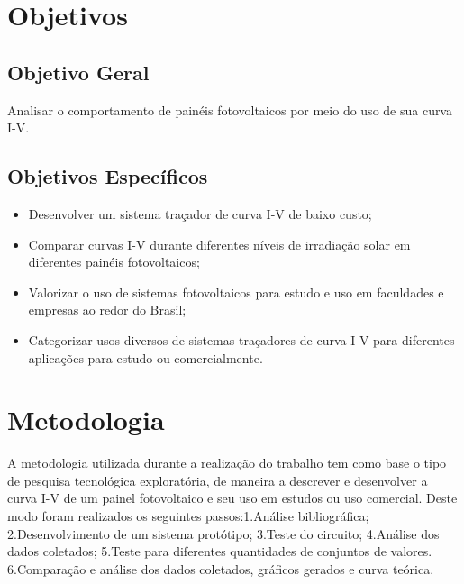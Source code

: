 \section{Objetivos}

\subsection{Objetivo Geral}

Analisar o comportamento de painéis fotovoltaicos por meio do uso de sua curva I-V.

\subsection{Objetivos Específicos}
\begin{itemize}
	\item Desenvolver um sistema traçador de curva I-V de baixo custo;
	\item Comparar curvas I-V durante diferentes níveis de irradiação solar em diferentes painéis fotovoltaicos;
	\item Valorizar o uso de sistemas fotovoltaicos para estudo e uso em faculdades e empresas ao redor do Brasil;
	\item Categorizar usos diversos de sistemas traçadores de curva I-V para diferentes aplicações para estudo ou comercialmente.

\end{itemize}

\section{Metodologia}

A metodologia utilizada durante a realização do trabalho tem como base o tipo de pesquisa tecnológica exploratória, de maneira a descrever e desenvolver a curva I-V de um painel fotovoltaico e seu uso em estudos ou uso comercial. Deste modo foram realizados os seguintes passos:1.Análise bibliográfica; 2.Desenvolvimento de um sistema protótipo; 3.Teste do circuito; 4.Análise dos dados coletados; 5.Teste para diferentes quantidades de conjuntos de valores. 6.Comparação e análise dos dados coletados, gráficos gerados e curva teórica.

